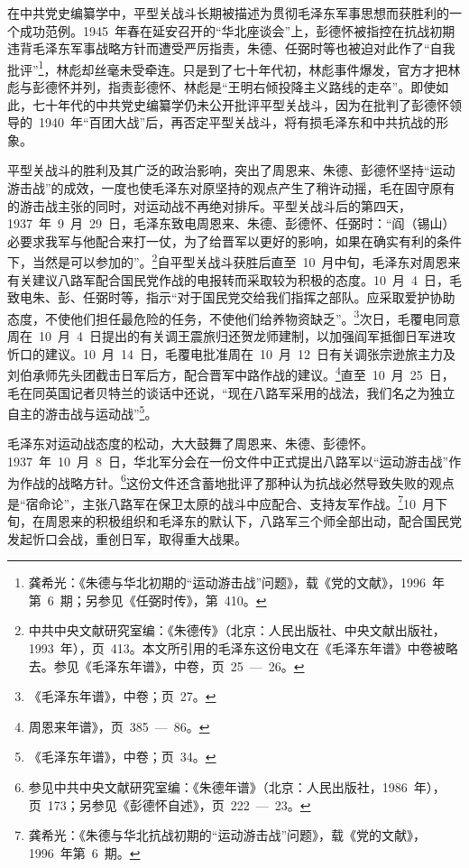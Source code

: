 在中共党史编纂学中，平型关战斗长期被描述为贯彻毛泽东军事思想而获胜利的一个成功范例。1945~年春在延安召开的“华北座谈会”上，彭德怀被指控在抗战初期违背毛泽东军事战略方针而遭受严厉指责，朱德、任弼时等也被迫对此作了“自我批评”\footnote{龚希光：《朱德与华北初期的“运动游击战”问题》，载《党的文献》，1996~年第~6~期；另参见《任弼时传》，第~410。}，林彪却丝毫未受牵连。只是到了七十年代初，林彪事件爆发，官方才把林彪与彭德怀并列，指责彭德怀、林彪是“王明右倾投降主义路线的走卒”。即使如此，七十年代的中共党史编纂学仍未公开批评平型关战斗，因为在批判了彭德怀领导的~1940~年“百团大战”后，再否定平型关战斗，将有损毛泽东和中共抗战的形象。

平型关战斗的胜利及其广泛的政治影响，突出了周恩来、朱德、彭德怀坚持“运动游击战”的成效，一度也使毛泽东对原坚持的观点产生了稍许动摇，毛在固守原有的游击战主张的同时，对运动战不再绝对排斥。平型关战斗后的第四天，1937~年~9~月~29~日，毛泽东致电周恩来、朱德、彭德怀、任弼时：“阎（锡山）必要求我军与他配合来打一仗，为了给晋军以更好的影响，如果在确实有利的条件下，当然是可以参加的”。\footnote{中共中央文献研究室编：《朱德传》（北京：人民出版社、中央文献出版社，1993~年），页~413。本文所引用的毛泽东这份电文在《毛泽东年谱》中卷被略去。参见《毛泽东年谱》，中卷，页~25~—~26。}自平型关战斗获胜后直至~10~月中旬，毛泽东对周恩来有关建议八路军配合国民党作战的电报转而采取较为积极的态度。10~月~4~日，毛致电朱、彭、任弼时等，指示“对于国民党交给我们指挥之部队。应采取爱护协助态度，不使他们担任最危险的任务，不使他们给养物资缺乏”。\footnote{《毛泽东年谱》，中卷；页~27。}次日，毛覆电同意周在~10~月~4~日提出的有关调王震旅归还贺龙师建制，以加强阎军抵御日军进攻忻口的建议。10~月~14~日，毛覆电批准周在~10~月~12~日有关调张宗逊旅主力及刘伯承师先头团截击日军后方，配合晋军中路作战的建议。\footnote{周恩来年谱》，页~385~—~86。}直至~10~月~25~日，毛在同英国记者贝特兰的谈话中还说，“现在八路军采用的战法，我们名之为独立自主的游击战与运动战”\footnote{《毛泽东年谱》，中卷；页~34。}。

毛泽东对运动战态度的松动，大大鼓舞了周恩来、朱德、彭德怀。1937~年~10~月~8~日，华北军分会在一份文件中正式提出八路军以“运动游击战”作为作战的战略方针。\footnote{参见中共中央文献研究室编：《朱德年谱》（北京：人民出版社，1986~年），页~173；另参见《彭德怀自述》，页~222~—~23。}这份文件还含蓄地批评了那种认为抗战必然导致失败的观点是“宿命论”，主张八路军在保卫太原的战斗中应配合、支持友军作战。\footnote{龚希光：《朱德与华北抗战初期的“运动游击战”问题》，载《党的文献》，1996~年第~6~期。}10~月下旬，在周恩来的积极组织和毛泽东的默认下，八路军三个师全部出动，配合国民党发起忻口会战，重创日军，取得重大战果。

